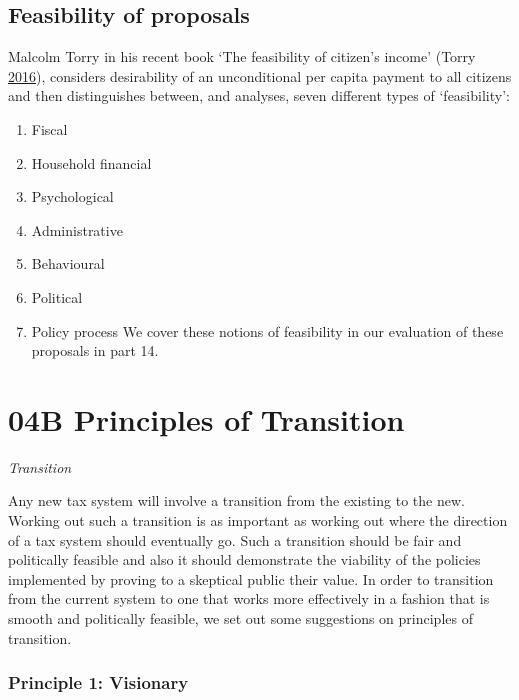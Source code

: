 \documentclass[]{tufte-handout}
\providecommand{\tightlist}{%
  \setlength{\itemsep}{0pt}\setlength{\parskip}{0pt}}
\begin{document}
\hypertarget{feasibility-of-proposals}{%
\subsection{\texorpdfstring{\textbf{Feasibility of
proposals}}{Feasibility of proposals}}\label{feasibility-of-proposals}}

Malcolm Torry in his recent book `The feasibility of citizen's income'
(Torry \protect\hyperlink{ref-Torry2016}{2016}), considers desirability
of an unconditional per capita payment to all citizens and then
distinguishes between, and analyses, seven different types of
`feasibility':

\begin{enumerate}
\def\labelenumi{\arabic{enumi}.}
\tightlist
\item
  Fiscal
\item
  Household financial
\item
  Psychological
\item
  Administrative
\item
  Behavioural
\item
  Political
\item
  Policy process We cover these notions of feasibility in our evaluation
  of these proposals in part 14.
\end{enumerate}

\newpage

\hypertarget{b-principles-of-transition}{%
\section{04B Principles of
Transition}\label{b-principles-of-transition}}

\emph{Transition}

Any new tax system will involve a transition from the existing to the
new. Working out such a transition is as important as working out where
the direction of a tax system should eventually go. Such a transition
should be fair and politically feasible and also it should demonstrate
the viability of the policies implemented by proving to a skeptical
public their value. In order to transition from the current system to
one that works more effectively in a fashion that is smooth and
politically feasible, we set out some suggestions on principles of
transition.

\hypertarget{principle-1-visionary}{%
\subsubsection{Principle 1: Visionary}\label{principle-1-visionary}}
\end{document}
